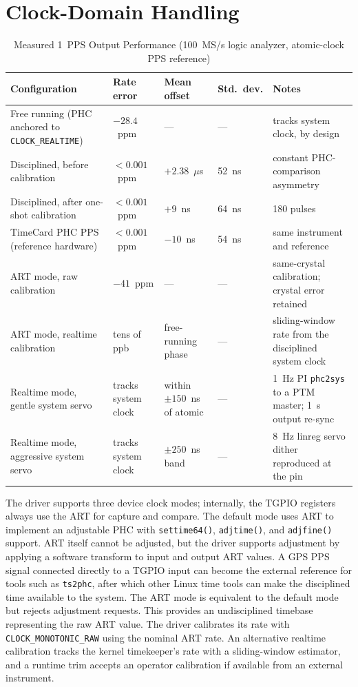 \documentclass[conference,a4paper]{IEEEtran}
\newcommand{\ClRT}{\texttt{CLOCK\_REALTIME}\xspace}
\newcommand{\phcsys}{\texttt{phc2sys}\xspace}
\newcommand{\tsphc}{\texttt{ts2phc}\xspace}
\begin{document}
\section{Clock-Domain Handling}\label{sec:clock-domain-handling}
\begin{table}[t]
\caption{Measured 1~PPS Output Performance (100~MS/s logic analyzer, atomic-clock PPS reference)}
\label{tab:eval}
\centering
\footnotesize
\begin{tabular}{@{}p{}lllp{}@{}}
\toprule
Configuration & Rate error & Mean offset & Std.\ dev. & Notes\\
\midrule
Free running (PHC anchored to \ClRT) & $-28.4$~ppm & --- & --- & tracks system clock, by design\\
Disciplined, before calibration & $<0.001$~ppm & $+2.38$~$\mu$s & 52~ns & constant PHC-comparison asymmetry\\
Disciplined, after one-shot calibration & $<0.001$~ppm & $+9$~ns & 64~ns & 180 pulses\\
TimeCard PHC PPS (reference hardware) & $<0.001$~ppm & $-10$~ns & 54~ns & same instrument and reference\\
\midrule
ART mode, raw calibration & $-41$~ppm & --- & --- & same-crystal calibration; crystal error retained\\
ART mode, realtime calibration & tens of ppb & free-running phase & --- & sliding-window rate from the disciplined system clock\\
Realtime mode, gentle system servo & tracks system clock & within $\pm 150$~ns of atomic & --- & 1~Hz PI \phcsys to a PTM master; 1~s output re-sync\\
Realtime mode, aggressive system servo & tracks system clock & $\pm 250$~ns band & --- & 8~Hz linreg servo dither reproduced at the pin\\
\bottomrule
\end{tabular}
\end{table}

The driver supports three device clock modes; internally, the TGPIO registers always use the ART for capture and compare. The default mode uses ART to implement an adjustable PHC with \texttt{settime64()}, \texttt{adjtime()}, and \texttt{adjfine()} support. ART itself cannot be adjusted, but the driver supports adjustment by applying a software transform to input and output ART values. A GPS PPS signal connected directly to a TGPIO input can become the external reference for tools such as \tsphc, after which other Linux time tools can make the disciplined time available to the system. The ART mode is equivalent to the default mode but rejects adjustment requests. This provides an undisciplined timebase representing the raw ART value. The driver calibrates its rate with  \texttt{CLOCK\_MONOTONIC\_RAW} using the nominal ART rate. An alternative realtime calibration tracks the kernel timekeeper's rate with a sliding-window estimator, and a runtime trim accepts an operator calibration if available from an external instrument.
\end{document}

